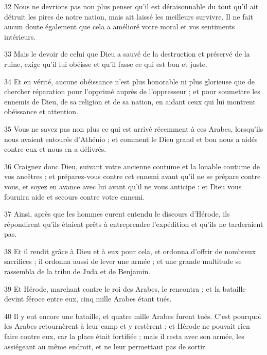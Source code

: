 \par 32 Nous ne devrions pas non plus penser qu'il est déraisonnable du tout qu'il ait détruit les pires de notre nation, mais ait laissé les meilleurs survivre. Il ne fait aucun doute également que cela a amélioré votre moral et vos sentiments intérieurs.

\par 33 Mais le devoir de celui que Dieu a sauvé de la destruction et préservé de la ruine, exige qu'il lui obéisse et qu'il fasse ce qui est bon et juste.

\par 34 Et en vérité, aucune obéissance n'est plus honorable ni plus glorieuse que de chercher réparation pour l'opprimé auprès de l'oppresseur ; et pour soumettre les ennemis de Dieu, de sa religion et de sa nation, en aidant ceux qui lui montrent obéissance et attention.

\par 35 Vous ne savez pas non plus ce qui est arrivé récemment à ces Arabes, lorsqu'ils nous avaient entourés d'Athénio ; et comment le Dieu grand et bon nous a aidés contre eux et nous en a délivrés.

\par 36 Craignez donc Dieu, suivant votre ancienne coutume et la louable coutume de vos ancêtres ; et préparez-vous contre cet ennemi avant qu'il ne se prépare contre vous, et soyez en avance avec lui avant qu'il ne vous anticipe : et Dieu vous fournira aide et secours contre votre ennemi.

\par 37 Ainsi, après que les hommes eurent entendu le discours d'Hérode, ils répondirent qu'ils étaient prêts à entreprendre l'expédition et qu'ils ne tarderaient pas.

\par 38 Et il rendit grâce à Dieu et à eux pour cela, et ordonna d'offrir de nombreux sacrifices ; il ordonna aussi de lever une armée ; et une grande multitude se rassembla de la tribu de Juda et de Benjamin.

\par 39 Et Hérode, marchant contre le roi des Arabes, le rencontra ; et la bataille devint féroce entre eux, cinq mille Arabes étant tués.

\par 40 Il y eut encore une bataille, et quatre mille Arabes furent tués. C'est pourquoi les Arabes retournèrent à leur camp et y restèrent ; et Hérode ne pouvait rien faire contre eux, car la place était fortifiée ; mais il resta avec son armée, les assiégeant au même endroit, et ne leur permettant pas de sortir.

